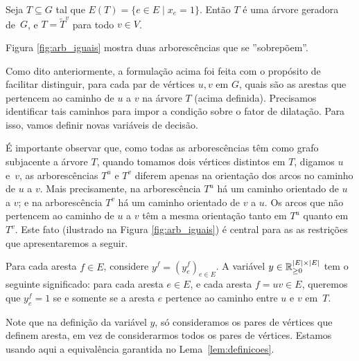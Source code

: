 \medskip

\begin{fato}
  \label{afirm:arv_geradora}
  Seja $T \subseteq G$ tal que $E(T) = \{e \in E \; |\; x_e = 1\}$. Então $T$
  é uma árvore geradora de~$G$, e $T=\widetilde{T}^{v}$ para todo
  $v\in V$.
\end{fato}
Figura \ref{fig:arb_iguais} mostra duas arborescências que se ''sobrepõem''.


\medskip

Como dito anteriormente,
a formulação acima foi feita com o propósito de facilitar distinguir,
para cada par de vértices $u,v$ em $G$, quais são as arestas que
pertencem ao caminho de $u$ a $v$ na árvore $T$ (acima definida).
Precisamos identificar tais caminhos para impor a condição sobre o
fator de dilatação. Para isso, vamos definir novas variáveis de decisão.

É importante observar que, como todas as arborescências têm como
grafo subjacente a árvore $T$, quando tomamos dois vértices
distintos em $T$, digamos $u$ e~$v$, as arborescências $T^u$ e $T^v$
diferem apenas na orientação dos arcos no caminho de $u$ a $v$.  
Mais precisamente, na arborescência $T^u$ há um caminho orientado
de $u$ a $v$; e
na arborescência $T^v$ há um caminho orientado de $v$ a $u$. Os 
arcos que não pertencem ao caminho de $u$ a $v$ têm a mesma
orientação tanto em $T^u$ quanto em $T^v$. Este fato (ilustrado na 
Figura \ref{fig:arb_iguais}) é central para as 
as restrições que apresentaremos a seguir.

Para cada aresta $f\in E$, considere $y^{f} = (y^{f}_{e})_{e \in E}$. 
A variável $y\in \mathbb{R}^{|E| \times |E|}_{\ge 0}$ tem o seguinte significado: para cada
aresta $e\in E$, e cada aresta $f = uv \in E$, queremos que
$y^{f}_{e} = 1$ se e somente se a aresta $e$ pertence ao caminho entre
$u$ e $v$ em~$T$.

Note que na definição da variável $y$, só consideramos os pares de
vértices que definem aresta, em vez de considerarmos todos os pares de
vértices. Estamos usando aqui a equivalência garantida no
Lema~\ref{lem:definicoes}.%


